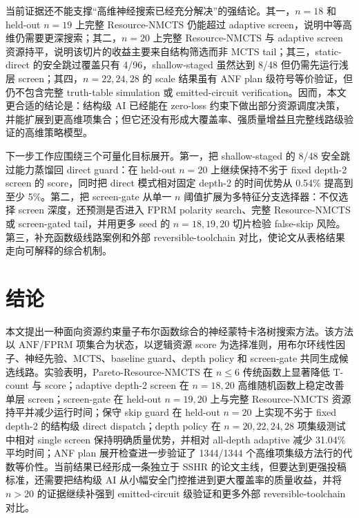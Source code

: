 \documentclass[UTF8,fontset=macnew,11pt]{ctexart}
\newcommand{\method}{Resource-NMCTS}
\newcommand{\pareto}{Pareto-Resource-NMCTS}
\newcommand{\anf}{\ensuremath{\mathrm{ANF}}}
\newcommand{\fprm}{\ensuremath{\mathrm{FPRM}}}
\newcommand{\mcts}{\ensuremath{\mathrm{MCTS}}}
\begin{document}
当前证据还不能支撑“高维神经搜索已经充分解决”的强结论。其一，$n=18$ 和 held-out $n=19$ 上完整 \method{} 仍能超过 adaptive screen，说明中等高维仍需要更深搜索；其二，$n=20$ 上完整 \method{} 与 adaptive screen 资源持平，说明该切片的收益主要来自结构筛选而非 MCTS tail；其三，static-direct 的安全跳过覆盖只有 4/96，shallow-staged 虽然达到 8/48 但仍需先运行浅层 screen；其四，$n=22,24,28$ 的 scale 结果虽有 ANF plan 级符号等价验证，但仍不包含完整 truth-table simulation 或 emitted-circuit verification。因而，本文更合适的结论是：结构级 AI 已经能在 zero-loss 约束下做出部分资源调度决策，并能扩展到更高维项集合；但它还没有形成大覆盖率、强质量增益且完整线路级验证的高维策略模型。

下一步工作应围绕三个可量化目标展开。第一，把 shallow-staged 的 8/48 安全跳过能力蒸馏回 direct guard：在 held-out $n=20$ 上继续保持不劣于 fixed depth-2 screen 的 score，同时把 direct 模式相对固定 depth-2 的时间优势从 0.54\% 提高到至少 5\%。第二，把 screen-gate 从单一 $n$ 阈值扩展为多特征分支选择器：不仅选择 screen 深度，还预测是否进入 \fprm{} polarity search、完整 \method{} 或 screen-gated tail，并用更多 seed 的 $n=18,19,20$ 切片检验 false-skip 风险。第三，补充函数级线路案例和外部 reversible-toolchain 对比，使论文从表格结果走向可解释的综合机制。

\section{结论}

本文提出一种面向资源约束量子布尔函数综合的神经蒙特卡洛树搜索方法。该方法以 \anf{}/\fprm{} 项集合为状态，以逻辑资源 score 为选择准则，用布尔环线性因子、神经先验、\mcts{}、baseline guard、depth policy 和 screen-gate 共同生成候选线路。实验表明，\pareto{} 在 $n\leq6$ 传统函数上显著降低 T-count 与 score；adaptive depth-2 screen 在 $n=18,20$ 高维随机函数上稳定改善单层 screen；screen-gate 在 held-out $n=19,20$ 上与完整 \method{} 资源持平并减少运行时间；保守 skip guard 在 held-out $n=20$ 上实现不劣于 fixed depth-2 的结构级 direct dispatch；depth policy 在 $n=20,22,24,28$ 项集级测试中相对 single screen 保持明确质量优势，并相对 all-depth adaptive 减少 31.04\% 平均时间；ANF plan 展开检查进一步验证了 1344/1344 个高维项集级方法行的代数等价性。当前结果已经形成一条独立于 SSHR 的论文主线，但要达到更强投稿标准，还需要把结构级 AI 从小幅安全门控推进到更大覆盖率的质量收益，并将 $n>20$ 的证据继续补强到 emitted-circuit 级验证和更多外部 reversible-toolchain 对比。
\end{document}
